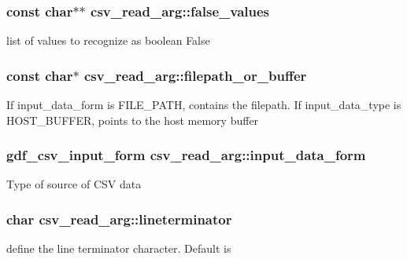 \subsubsection[{\texorpdfstring{false\+\_\+values}{false_values}}]{\setlength{\rightskip}{0pt plus 5cm}const char$\ast$$\ast$ csv\+\_\+read\+\_\+arg\+::false\+\_\+values}\hypertarget{structcsv__read__arg_af0c32a31f8e26251428207dc939aecff}{}\label{structcsv__read__arg_af0c32a31f8e26251428207dc939aecff}
list of values to recognize as boolean False 
\subsubsection[{\texorpdfstring{filepath\+\_\+or\+\_\+buffer}{filepath_or_buffer}}]{\setlength{\rightskip}{0pt plus 5cm}const char$\ast$ csv\+\_\+read\+\_\+arg\+::filepath\+\_\+or\+\_\+buffer}\hypertarget{structcsv__read__arg_aa2c43a3229c5829188cc2f24f2699eaf}{}\label{structcsv__read__arg_aa2c43a3229c5829188cc2f24f2699eaf}
If input\+\_\+data\+\_\+form is F\+I\+L\+E\+\_\+\+P\+A\+TH, contains the filepath. If input\+\_\+data\+\_\+type is H\+O\+S\+T\+\_\+\+B\+U\+F\+F\+ER, points to the host memory buffer 
\subsubsection[{\texorpdfstring{input\+\_\+data\+\_\+form}{input_data_form}}]{\setlength{\rightskip}{0pt plus 5cm}gdf\+\_\+csv\+\_\+input\+\_\+form csv\+\_\+read\+\_\+arg\+::input\+\_\+data\+\_\+form}\hypertarget{structcsv__read__arg_adf3a23fd53fbf0417e372cbb5e9d90a7}{}\label{structcsv__read__arg_adf3a23fd53fbf0417e372cbb5e9d90a7}
Type of source of C\+SV data 
\subsubsection[{\texorpdfstring{lineterminator}{lineterminator}}]{\setlength{\rightskip}{0pt plus 5cm}char csv\+\_\+read\+\_\+arg\+::lineterminator}\hypertarget{structcsv__read__arg_adf76239d00694c506ceaaf3d45650bc7}{}\label{structcsv__read__arg_adf76239d00694c506ceaaf3d45650bc7}
define the line terminator character. Default is \textquotesingle{}~\newline
\textquotesingle{} 
